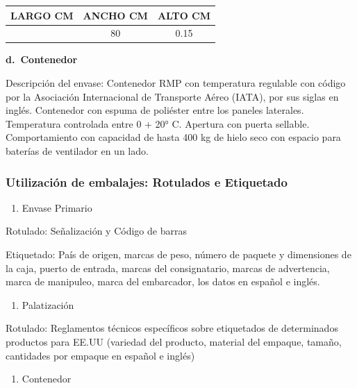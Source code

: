 \documentclass[
  stu,
  floatsintext,
  longtable,
  a4paper,
  nolmodern,
  notxfonts,
  notimes,
  12pt,
  colorlinks=true,linkcolor=blue,citecolor=blue,urlcolor=blue]{apa7}
\providecommand{\tightlist}{%
  \setlength{\itemsep}{0pt}\setlength{\parskip}{0pt}}
\newcounter{none} %
\begin{document}
{\def\LTcaptype{none} %
\begin{longtable}[]{@{}ccc@{}}
\toprule\noalign{}
LARGO CM & ANCHO CM & ALTO CM \\
\midrule\noalign{}
\endhead
\bottomrule\noalign{}
\endlastfoot
120 & 80 & 0.15 \\
\end{longtable}
}

\textbf{d.~Contenedor}

Descripción del envase: Contenedor RMP con temperatura regulable con
código por la Asociación Internacional de Transporte Aéreo (IATA), por
sus siglas en inglés. Contenedor con espuma de poliéster entre los
paneles laterales. Temperatura controlada entre 0 + 20° C. Apertura con
puerta sellable. Comportamiento con capacidad de hasta 400 kg de hielo
seco con espacio para baterías de ventilador en un lado.

\subsubsection{Utilización de embalajes: Rotulados e
Etiquetado}\label{utilizaciuxf3n-de-embalajes-rotulados-e-etiquetado}

\begin{enumerate}
\def\labelenumi{\alph{enumi})}
\tightlist
\item
  Envase Primario
\end{enumerate}

Rotulado: Señalización y Código de barras

Etiquetado: País de origen, marcas de peso, número de paquete y
dimensiones de la caja, puerto de entrada, marcas del consignatario,
marcas de advertencia, marca de manipuleo, marca del embarcador, los
datos en español e inglés.

\begin{enumerate}
\def\labelenumi{\alph{enumi})}
\setcounter{enumi}{1}
\tightlist
\item
  Palatización
\end{enumerate}

Rotulado: Reglamentos técnicos específicos sobre etiquetados de
determinados productos para EE.UU (variedad del producto, material del
empaque, tamaño, cantidades por empaque en español e inglés)

\begin{enumerate}
\def\labelenumi{\alph{enumi})}
\setcounter{enumi}{2}
\tightlist
\item
  Contenedor
\end{enumerate}
\end{document}
